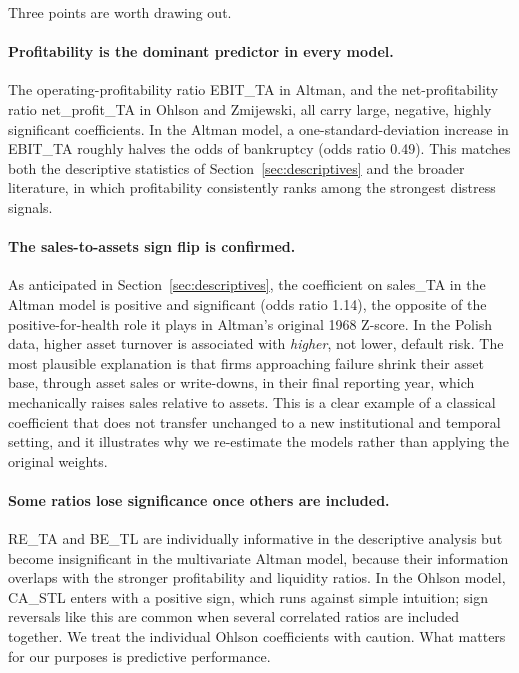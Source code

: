 \documentclass[12pt,a4paper]{article}
\begin{document}
Three points are worth drawing out.

\paragraph{Profitability is the dominant predictor in every model.} The
operating-profitability ratio EBIT\_TA in Altman, and the net-profitability
ratio net\_profit\_TA in Ohlson and Zmijewski, all carry large, negative,
highly significant coefficients. In the Altman model, a one-standard-deviation
increase in EBIT\_TA roughly halves the odds of bankruptcy (odds ratio 0.49).
This matches both the descriptive statistics of Section~\ref{sec:descriptives}
and the broader literature, in which profitability consistently ranks among
the strongest distress signals.

\paragraph{The sales-to-assets sign flip is confirmed.} As anticipated in
Section~\ref{sec:descriptives}, the coefficient on sales\_TA in the Altman
model is positive and significant (odds ratio 1.14), the opposite of the
positive-for-health role it plays in Altman's original 1968 Z-score. In the
Polish data, higher asset turnover is associated with \emph{higher}, not
lower, default risk. The most plausible explanation is that firms approaching
failure shrink their asset base, through asset sales or write-downs, in
their final reporting year, which mechanically raises sales relative to
assets. This is a clear example of a classical coefficient that does not
transfer unchanged to a new institutional and temporal setting, and it
illustrates why we re-estimate the models rather than applying the original
weights.

\paragraph{Some ratios lose significance once others are included.} RE\_TA and
BE\_TL are individually informative in the descriptive analysis but become
insignificant in the multivariate Altman model, because their information
overlaps with the stronger profitability and liquidity ratios. In the Ohlson model, CA\_STL enters with a positive sign, which runs against
simple intuition; sign reversals like this are common when several correlated
ratios are included together. We treat the individual Ohlson coefficients with
caution. What matters for our purposes is predictive performance.
\end{document}
